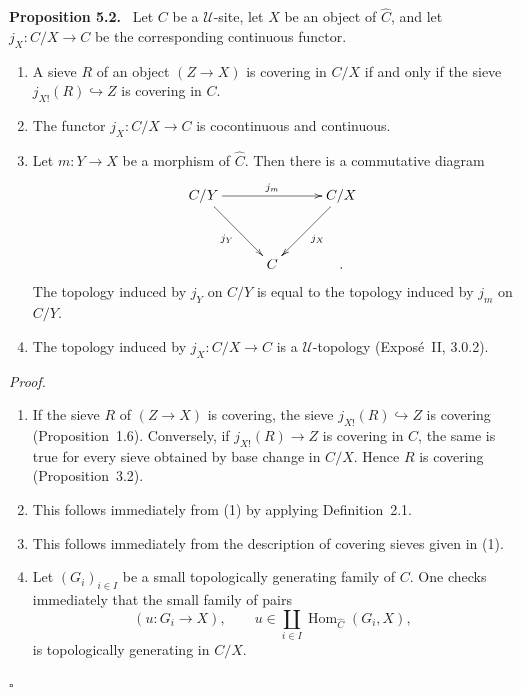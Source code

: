 \documentclass[11pt]{article}
\newcommand{\U}{\mathcal{U}}
\newcommand{\Hom}{\operatorname{Hom}}
\newcommand{\qedtext}{\hfill\(\square\)}
\newenvironment{statement}[1]{\par\medskip\noindent\textbf{#1.}\ }{\par\medskip}
\newenvironment{prooftext}{\par\noindent\emph{Proof.}\ }{\par\medskip}
\begin{document}
\begin{statement}{Proposition 5.2}
Let \(C\) be a \(\U\)-site, let \(X\) be an object of \(\widehat C\), and let \(j_X:C/X\to C\) be the corresponding continuous functor.
\begin{enumerate}[label=\arabic*)]
\item A sieve \(R\) of an object \((Z\to X)\) is covering in \(C/X\) if and only if the sieve \(j_{X!}(R)\hookrightarrow Z\) is covering in \(C\).
\item The functor \(j_X:C/X\to C\) is cocontinuous and continuous.
\item Let \(m:Y\to X\) be a morphism of \(\widehat C\). Then there is a commutative diagram
\[
\xymatrix@C=1cm@R=1.25cm{
C/Y\ar[rr]^{j_m}\ar[rd]_{j_Y}& &C/X\ar[ld]^{j_X}\\
& C& .
}
\]
The topology induced by \(j_Y\) on \(C/Y\) is equal to the topology induced by \(j_m\) on \(C/Y\).
\item The topology induced by \(j_X:C/X\to C\) is a \(\U\)-topology (Expos\'e~II, 3.0.2).
\end{enumerate}
\end{statement}

\begin{prooftext}
\begin{enumerate}[label=\arabic*)]
\item If the sieve \(R\) of \((Z\to X)\) is covering, the sieve \(j_{X!}(R)\hookrightarrow Z\) is covering (Proposition~1.6). Conversely, if \(j_{X!}(R)\to Z\) is covering in \(C\), the same is true for every sieve obtained by base change in \(C/X\). Hence \(R\) is covering (Proposition~3.2).
\item This follows immediately from (1) by applying Definition~2.1.
\item This follows immediately from the description of covering sieves given in (1).
\item Let \((G_i)_{i\in I}\) be a small topologically generating family of \(C\). One checks immediately that the small family of pairs
\[
(u:G_i\to X),\qquad u\in\coprod_{i\in I}\Hom_{\widehat C}(G_i,X),
\]
is topologically generating in \(C/X\).
\end{enumerate}
\qedtext
\end{prooftext}
\end{document}
